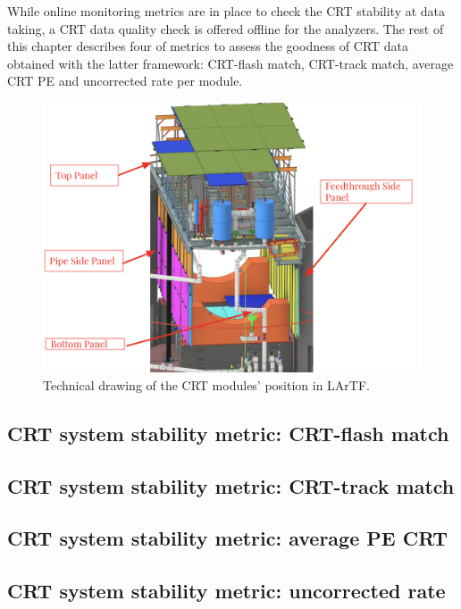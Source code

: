 While online monitoring metrics are in place to check the CRT stability at data taking, a CRT data quality check is offered offline for the analyzers.  
The rest of this chapter describes four of metrics to assess the goodness of CRT data obtained with the latter framework: CRT-flash match, CRT-track match, average CRT PE and uncorrected rate per module.

\begin{figure}[h!]
\centering
\includegraphics[scale=0.3]{images/CRTScheme}
\caption{Technical drawing of the CRT modules' position in LArTF.}
\label{fig:CRT}
\end{figure}




\subsection{CRT system stability metric: CRT-flash match}
\subsection{CRT system stability metric: CRT-track match}
\subsection{CRT system stability metric: average PE CRT}
\subsection{CRT system stability metric: uncorrected rate}


